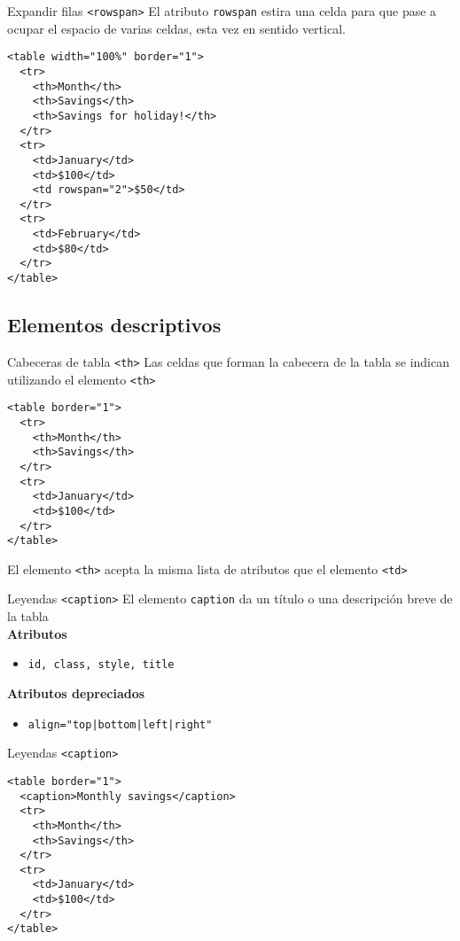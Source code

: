 \documentclass{beamer}
\begin{document}
\begin{frame}[fragile]{Expandir filas \texttt{<rowspan>}} %
    El atributo \texttt{rowspan} estira una celda para que pase a ocupar el
    espacio de varias celdas, esta vez en sentido vertical. 
    \begin{lstlisting}
<table width="100%" border="1">
  <tr>
    <th>Month</th>
    <th>Savings</th>
    <th>Savings for holiday!</th>
  </tr>
  <tr>
    <td>January</td>
    <td>$100</td>
    <td rowspan="2">$50</td>
  </tr>
  <tr>
    <td>February</td>
    <td>$80</td>
  </tr>
</table>
    \end{lstlisting}
\end{frame}


\subsection{Elementos descriptivos} %

\begin{frame}[fragile]{Cabeceras de tabla \texttt{<th>}} %
    Las celdas que forman la cabecera de la tabla se indican utilizando el
    elemento  \texttt{<th>} \\
    \begin{lstlisting}
<table border="1">
  <tr>
    <th>Month</th>
    <th>Savings</th>
  </tr>
  <tr>
    <td>January</td>
    <td>$100</td>
  </tr>
</table>
    \end{lstlisting}
    El elemento \texttt{<th>} acepta la misma lista de atributos que el
    elemento \texttt{<td>}
\end{frame}

\begin{frame}[fragile]{Leyendas \texttt{<caption>} } %
    El elemento \texttt{caption} da un título o una descripción breve de la
    tabla\\[0.2cm]
    \textbf{Atributos}
    \begin{itemize}
        \item \texttt{id, class, style, title} 
    \end{itemize}


    \textbf{Atributos depreciados}
    \begin{itemize}
        \item \texttt{align="top|bottom|left|right"}
    \end{itemize}

\end{frame}

\begin{frame}[fragile]{Leyendas \texttt{<caption>} } %
\begin{lstlisting}[]
<table border="1">
  <caption>Monthly savings</caption>
  <tr>
    <th>Month</th>
    <th>Savings</th>
  </tr>
  <tr>
    <td>January</td>
    <td>$100</td>
  </tr>
</table>    
\end{lstlisting}
\end{frame}

\end{document}
